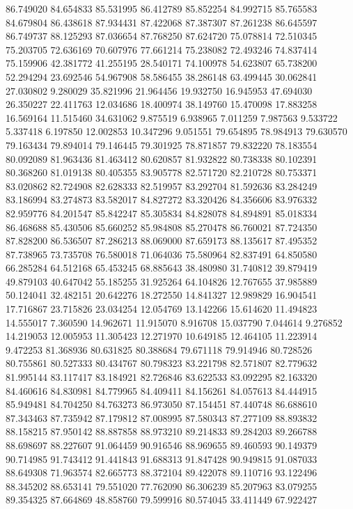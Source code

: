 86.749020
84.654833
85.531995
86.412789
85.852254
84.992715
85.765583
84.679804
86.438618
87.934431
87.422068
87.387307
87.261238
86.645597
86.749737
88.125293
87.036654
87.768250
87.624720
75.078814
72.510345
75.203705
72.636169
70.607976
77.661214
75.238082
72.493246
74.837414
75.159906
42.381772
41.255195
28.540171
74.100978
54.623807
65.738200
52.294294
23.692546
54.967908
58.586455
38.286148
63.499445
30.062841
27.030802
9.280029
35.821996
21.964456
19.932750
16.945953
47.694030
26.350227
22.411763
12.034686
18.400974
38.149760
15.470098
17.883258
16.569164
11.515460
34.631062
9.875519
6.938965
7.011259
7.987563
9.533722
5.337418
6.197850
12.002853
10.347296
9.051551
79.654895
78.984913
79.630570
79.163434
79.894014
79.146445
79.301925
78.871857
79.832220
78.183554
80.092089
81.963436
81.463412
80.620857
81.932822
80.738338
80.102391
80.368260
81.019138
80.405355
83.905778
82.571720
82.210728
80.753371
83.020862
82.724908
82.628333
82.519957
83.292704
81.592636
83.284249
83.186994
83.274873
83.582017
84.827272
83.320426
84.356606
83.976332
82.959776
84.201547
85.842247
85.305834
84.828078
84.894891
85.018334
86.468688
85.430506
85.660252
85.984808
85.270478
86.760021
87.724350
87.828200
86.536507
87.286213
88.069000
87.659173
88.135617
87.495352
87.738965
73.735708
76.580018
71.064036
75.580964
82.837491
64.850580
66.285284
64.512168
65.453245
68.885643
38.480980
31.740812
39.879419
49.879103
40.647042
55.185255
31.925264
64.104826
12.767655
37.985889
50.124041
32.482151
20.642276
18.272550
14.841327
12.989829
16.904541
17.716867
23.715826
23.034254
12.054769
13.142266
15.614620
11.494823
14.555017
7.360590
14.962671
11.915070
8.916708
15.037790
7.044614
9.276852
14.219053
12.005953
11.305423
12.271970
10.649185
12.464105
11.223914
9.472253
81.368936
80.631825
80.388684
79.671118
79.914946
80.728526
80.755861
80.527333
80.434767
80.798323
83.221798
82.571807
82.779632
81.995144
83.117417
83.184921
82.726846
83.622533
83.092295
82.163320
84.460616
84.830981
84.779965
84.409411
84.156261
84.057613
84.444915
85.949481
84.704250
84.763273
86.973050
87.154451
87.440748
86.688610
87.343463
87.735942
87.179812
87.008995
87.580343
87.277109
88.893832
88.158215
87.950142
88.887858
88.973210
89.214833
89.284203
89.266788
88.698697
88.227607
91.064459
90.916546
88.969655
89.460593
90.149379
90.714985
91.743412
91.441843
91.688313
91.847428
90.949815
91.087033
88.649308
71.963574
82.665773
88.372104
89.422078
89.110716
93.122496
88.345202
88.653141
79.551020
77.762090
86.306239
85.207963
83.079255
89.354325
87.664869
48.858760
79.599916
80.574045
33.411449
67.922427
